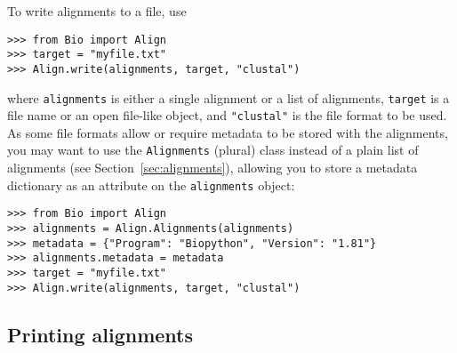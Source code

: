 To write alignments to a file, use
\begin{verbatim}
>>> from Bio import Align
>>> target = "myfile.txt"
>>> Align.write(alignments, target, "clustal")
\end{verbatim}
where \verb|alignments| is either a single alignment or a list of alignments, \verb|target| is a file name or an open file-like object, and \verb|"clustal"| is the file format to be used. As some file formats allow or require metadata to be stored with the alignments, you may want to use the \verb|Alignments| (plural) class instead of a plain list of alignments (see Section~\ref{sec:alignments}), allowing you to store a metadata dictionary as an attribute on the \verb|alignments| object:
\begin{verbatim}
>>> from Bio import Align
>>> alignments = Align.Alignments(alignments)
>>> metadata = {"Program": "Biopython", "Version": "1.81"}
>>> alignments.metadata = metadata
>>> target = "myfile.txt"
>>> Align.write(alignments, target, "clustal")
\end{verbatim}

\subsection{Printing alignments}
\label{subsec:align_printing}

